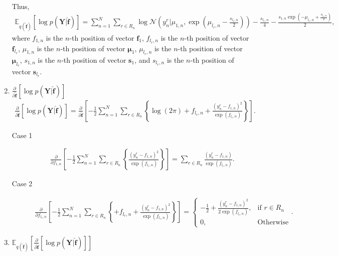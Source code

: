\documentclass[9pt]{article}
\providecommand{\ve}[1]{{\bm{#1}}}%
\providecommand{\mat}[1]{{\bm{#1}}} %
\newcommand{\muvec}{\boldsymbol{\mu}}
\providecommand{\ve}[1]{{\mathbf{#1}}}
\providecommand{\mat}[1]{{\mathbf{#1}}}
\newcommand{\fracpartial}[2]{\frac{\partial #1}{\partial  #2}} %
\newcommand{\gauss}{\mathcal{N}} %
\begin{document}
\begin{enumerate}
{\begin{align}
		\end{align}}
	Thus, 
	\begin{align}
	\mathbb{E}_{q(\hat{\ve{f}})}\left[\log p(\mat{Y}|\hat{\ve{f}})\right] = \sum_{n=1}^{N}\sum_{r\in R_n}\log \gauss\left(y_n^r|\mu_{1,n}, \exp\left({\mu_{l_r,n}-\frac{s_{l_r,n}}{2}}\right)\right) - \frac{s_{l_r,n}}{4} - \frac{s_{1,n}\exp\left(-\mu_{l_r,n} + \frac{s_{l_r,n}}{2} \right)}{2},
	\end{align}
	where $f_{1,n}$ is the $n$-th position of vector $\ve{f}_1$, $f_{l_r,n}$ is the $n$-th position of vector $\ve{f}_{l_r}$, $\mu_{1,n}$ is the $n$-th position of vector $\muvec_1$, $\mu_{l_r,n}$ is the $n$-th position of vector $\muvec_{l_r}$, $s_{1,n}$ is the $n$-th position of vector $\ve{s}_{1}$, and $s_{l_r,n}$ is the $n$-th position of vector $\ve{s}_{l_r}$.
	\item $\fracpartial{}{\hat{\ve{f}}}\left[\log p(\mat{Y}|\hat{\ve{f}})\right]$
	\begin{align}
	\fracpartial{}{\hat{\ve{f}}}\left[\log p(\mat{Y}|\hat{\ve{f}})\right] = \fracpartial{}{\hat{\ve{f}}}\left[-\frac{1}{2}\sum_{n=1}^{N}\sum_{r\in R_n} \left\{\log(2\pi) + f_{l_r,n} + \frac{(y_n^r - f_{1,n})^2}{\exp(f_{l_r,n})}  \right\}\right].
	\end{align}
	\begin{description}
		\item[Case 1]
		\begin{align}
		\fracpartial{}{f_{1,n}}\left[-\frac{1}{2}\sum_{n=1}^{N}\sum_{r\in R_n} \left\{\frac{(y_n^r - f_{1,n})^2}{\exp(f_{l_r,n})}  \right\}\right] = \sum_{r\in R_n}\frac{(y_n^r - f_{1,n})}{\exp(f_{l_r,n})}.
		\end{align}
		\item[Case 2]
		\begin{align}
		\fracpartial{}{f_{l_r,n}}\left[-\frac{1}{2}\sum_{n=1}^{N}\sum_{r\in R_n} \left\{ + f_{l_r,n} + \frac{(y_n^r - f_{1,n})^2}{\exp(f_{l_r,n})}  \right\}\right] = \begin{cases}
		-\frac{1}{2} + \frac{(y_n^r - f_{1,n})^2}{2\exp(f_{l_r,n})}, & \mbox{if $r\in R_n$}\\
		0, & \mbox{Otherwise}
		\end{cases}.
		\end{align}
	\end{description}
	\item $\mathbb{E}_{q(\hat{\ve{f}})}\left[\fracpartial{}{\hat{\ve{f}}}\left[\log p(\mat{Y}|\hat{\ve{f}})\right]\right]$



\end{enumerate}
\end{document}
